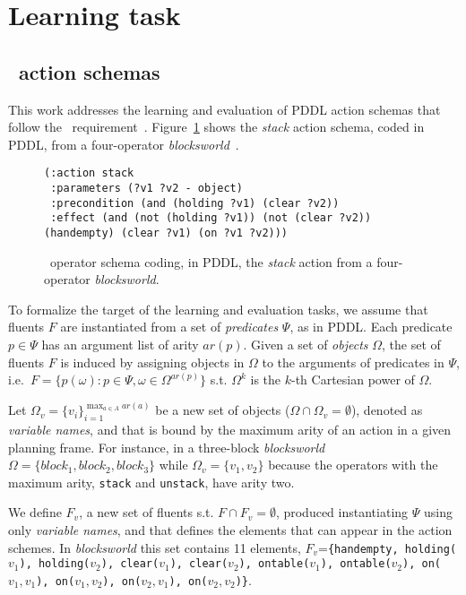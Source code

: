 \section{Learning task}
\label{learning_task}


\subsection{\strips\ action schemas}
This work addresses the learning and evaluation of PDDL action schemas that follow the \strips\ requirement~\cite{mcdermott1998pddl,fox2003pddl2}. Figure~\ref{fig:stack} shows the {\em stack} action schema, coded in PDDL, from a four-operator {\em blocksworld}~\cite{slaney2001blocks}.

\begin{figure}[hbt!]
\begin{footnotesize}
\begin{verbatim}
(:action stack
 :parameters (?v1 ?v2 - object)
 :precondition (and (holding ?v1) (clear ?v2))
 :effect (and (not (holding ?v1)) (not (clear ?v2)) (handempty) (clear ?v1) (on ?v1 ?v2)))
\end{verbatim}
\end{footnotesize}
 \caption{\small \strips\ operator schema coding, in PDDL, the {\em stack} action from a four-operator {\em blocksworld}.}
\label{fig:stack}
\end{figure}

To formalize the target of the learning and evaluation tasks, we assume that fluents $F$ are instantiated from a set of {\em predicates} $\Psi$, as in PDDL. Each predicate $p\in\Psi$ has an argument list of arity $ar(p)$. Given a set of {\em objects} $\Omega$, the set of fluents $F$ is induced by assigning objects in $\Omega$ to the arguments of predicates in $\Psi$, i.e.~$F=\{p(\omega):p\in\Psi,\omega\in\Omega^{ar(p)}\}$ s.t. $\Omega^k$ is the $k$-th Cartesian power of $\Omega$.

Let $\Omega_v=\{v_i\}_{i=1}^{\operatorname*{max}_{a\in A} ar(a)}$ be a new set of objects ($\Omega\cap\Omega_v=\emptyset$), denoted as {\em variable names}, and that is bound by the maximum arity of an action in a given planning frame. For instance, in a three-block {\em blocksworld} $\Omega=\{block_1, block_2, block_3\}$ while $\Omega_v=\{v_1, v_2\}$ because the operators with the maximum arity, {\small\tt stack} and {\small\tt unstack}, have arity two.

We define $F_v$, a new set of fluents s.t. $F\cap F_v=\emptyset$, produced instantiating $\Psi$ using only {\em variable names}, and that defines the elements that can appear in the action schemes. In {\em blocksworld} this set contains 11 elements, $F_v$={\small\tt\{handempty, holding($v_1$), holding($v_2$), clear($v_1$), clear($v_2$), ontable($v_1$), ontable($v_2$), on($v_1,v_1$), on($v_1,v_2$), on($v_2,v_1$), on($v_2,v_2$)\}}.

